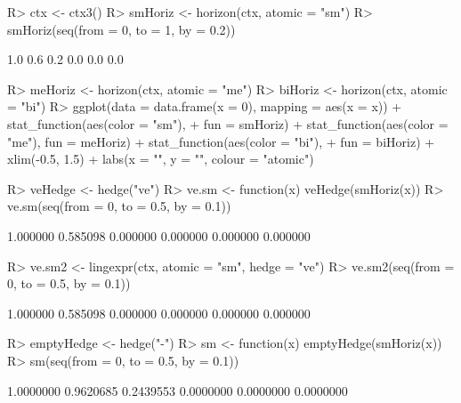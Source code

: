 \documentclass{article}\usepackage[]{graphicx}\usepackage[]{color}
\begin{document}
\begin{Schunk}
% --begin: "horizon"
\begin{Sinput}
R> ctx <- ctx3()
R> smHoriz <- horizon(ctx, atomic = "sm")
R> smHoriz(seq(from = 0, to = 1, by = 0.2))
\end{Sinput}
\begin{Soutput}
[1] 1.0 0.6 0.2 0.0 0.0 0.0
\end{Soutput}
%
% --end: "horizon"
\end{Schunk}

\begin{Schunk}
\begin{Sinput}
R> meHoriz <- horizon(ctx, atomic = "me")
R> biHoriz <- horizon(ctx, atomic = "bi")
R> ggplot(data = data.frame(x = 0), mapping = aes(x = x)) + stat_function(aes(color = "sm"), 
+      fun = smHoriz) + stat_function(aes(color = "me"), fun = meHoriz) + stat_function(aes(color = "bi"), 
+      fun = biHoriz) + xlim(-0.5, 1.5) + labs(x = "", y = "", colour = "atomic\nexpression")
\end{Sinput}
\end{Schunk}

\begin{Schunk}
% --begin: "hedge"
\begin{Sinput}
R> veHedge <- hedge("ve")
R> ve.sm <- function(x) veHedge(smHoriz(x))
R> ve.sm(seq(from = 0, to = 0.5, by = 0.1))
\end{Sinput}
\begin{Soutput}
[1] 1.000000 0.585098 0.000000 0.000000 0.000000 0.000000
\end{Soutput}
%
% --end: "hedge"
\end{Schunk}


\begin{Schunk}
% --begin: "lingexpr"
\begin{Sinput}
R> ve.sm2 <- lingexpr(ctx, atomic = "sm", hedge = "ve")
R> ve.sm2(seq(from = 0, to = 0.5, by = 0.1))
\end{Sinput}
\begin{Soutput}
[1] 1.000000 0.585098 0.000000 0.000000 0.000000 0.000000
\end{Soutput}
%
% --end: "lingexpr"
\end{Schunk}

\begin{Schunk}
% --begin: "emptyhedge1"
\begin{Sinput}
R> emptyHedge <- hedge("-")
R> sm <- function(x) emptyHedge(smHoriz(x))
R> sm(seq(from = 0, to = 0.5, by = 0.1))
\end{Sinput}
\begin{Soutput}
[1] 1.0000000 0.9620685 0.2439553 0.0000000 0.0000000 0.0000000
\end{Soutput}
%
% --end: "emptyhedge1"
\end{Schunk}
\end{document}
